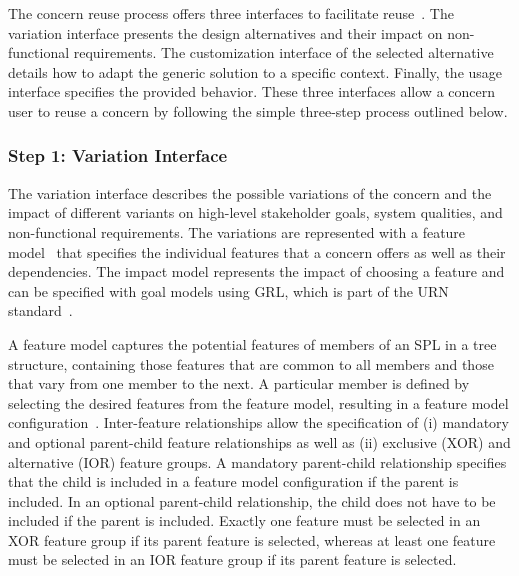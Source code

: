 The concern reuse process offers three interfaces to facilitate reuse~\cite{alam2013concern}. The variation interface presents the design alternatives and their impact on non-functional requirements. The customization interface of the selected alternative details how to adapt the generic solution to a specific context. Finally, the usage interface specifies the provided behavior. These three interfaces allow a concern user to reuse a concern by following the simple three-step process outlined below.

\subsubsection{Step 1: Variation Interface}

The variation interface describes the possible variations of the concern and the impact of different variants on high-level stakeholder goals, system qualities, and non-functional requirements. The variations are represented with a feature model~\cite{kang1990feature} that specifies the individual features that a concern offers as well as their dependencies. The impact model represents the impact of choosing a feature and can be specified with goal models using GRL, which is part of the URN standard~\cite{itu2012151}.

A feature model captures the potential features of members of an SPL in a tree structure, containing those features that are common to all members and those that vary from one member to the next. A particular member is defined by selecting the desired features from the feature model, resulting in a feature model configuration~\cite{czarnecki2005staged}. Inter-feature relationships allow the specification of (i) mandatory and optional parent-child feature relationships as well as (ii) exclusive (XOR) and alternative (IOR) feature groups. A mandatory parent-child relationship specifies that the child is included in a feature model configuration if the parent is included. In an optional parent-child relationship, the child does not have to be included if the parent is included. Exactly one feature must be selected in an XOR feature group if its parent feature is selected, whereas at least one feature must be selected in an IOR feature group if its parent feature is selected.

